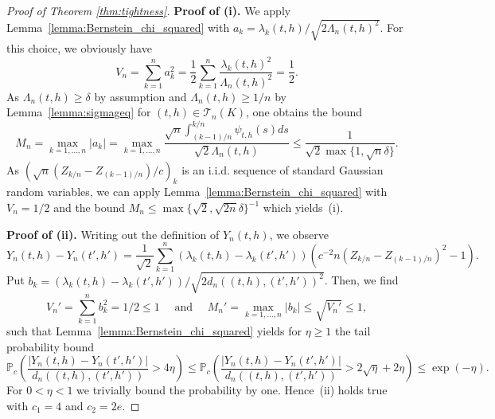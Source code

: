 \documentclass[10.5pt,letter]{article}
\numberwithin{equation}{section}
\theoremstyle{definition}
\renewcommand{\P}{\mathbb{P}}
\newcommand{\1}{\mathbbm{1}}
\begin{document}
\begin{proof}[Proof of Theorem \ref{thm:tightness}]
    \textbf{Proof of (i).} We apply Lemma~\ref{lemma:Bernstein_chi_squared} with $a_k=\lambda_k(t,h)/\sqrt{2\Lambda_n(t,h)^2}$. For this choice, we obviously have
    \[ V_n = \sum_{k=1}^n a_k^2 = \frac12\sum_{k=1}^n \frac{\lambda_k(t,h)^2}{\Lambda_n(t,h)^2} =\frac12.\]
    As $\Lambda_n(t,h)\geq\delta$ by assumption and $\Lambda_n(t,h)\geq 1/n$ by Lemma~\ref{lemma:sigmageq} for $(t,h)\in\mathcal{T}_n(K)$, one obtains the bound
    \[ M_n = \max_{k=1,\dots, n}|a_k| = \max_{k=1,\dots, n} \frac{\sqrt{n}\int_{(k-1)/n}^{k/n} \psi_{t,h}(s)ds}{\sqrt{2} \Lambda_n(t,h)} \leq  \frac{1}{\sqrt{2}\max\{1, \sqrt{n}\delta\}}.\]
    As $(\sqrt{n}(Z_{k/n}-Z_{(k-1)/n})/c)_k$ is an i.i.d. sequence of standard Gaussian random variables, we can apply Lemma~\ref{lemma:Bernstein_chi_squared} with $V_n=1/2$ and the bound $M_n\leq \max\{\sqrt{2},\sqrt{2n}\delta\}^{-1}$ which yields~(i).\smallskip

    \textbf{Proof of (ii).} Writing out the definition of $Y_n(t,h)$, we observe
    \[ Y_n(t,h)-Y_n(t',h') = \frac{1}{\sqrt{2}}\sum_{k=1}^n \left(\lambda_k(t,h)-\lambda_k(t',h')\right)\left( c^{-2}n\left( Z_{k/n}-Z_{(k-1)/n}\right)^2-1\right).\]
    Put $b_k = (\lambda_k(t,h)-\lambda_k(t',h'))/\sqrt{2d_n((t,h),(t',h'))^2}$. Then, we find 
    \[ V_n'=\sum_{k=1}^n b_k^2 =1/2\leq 1 \quad\textrm{ and }\quad M_n'=\max_{k=1,\dots,n}|b_k|\leq \sqrt{V_n'}\leq 1, \]
    such that Lemma~\ref{lemma:Bernstein_chi_squared} yields for $\eta\geq 1$ the tail probability bound
    \[ \P_c\left(\frac{|Y_n(t,h)-Y_n(t',h')|}{d_n((t,h),(t',h'))} > 4\eta\right) \leq \P_c\left(\frac{|Y_n(t,h)-Y_n(t',h')|}{d_n((t,h),(t',h'))} > 2\sqrt{\eta}+ 2\eta\right) \leq \exp\left(-\eta\right). \]
    For $0<\eta<1$ we trivially bound the probability by one. Hence~(ii) holds true with $c_1=4$ and $c_2=2e$. \smallskip


\end{proof}
\end{document}
